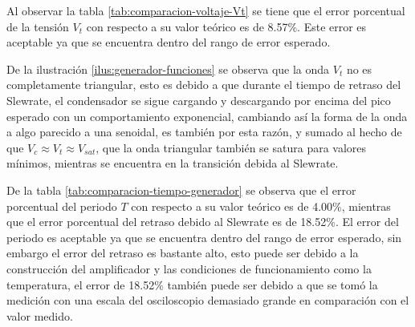 Al observar la tabla \ref{tab:comparacion-voltaje-Vt} se tiene que el error porcentual de la tensión $V_t$ con respecto a su valor teórico es de 8.57\%. Este error es aceptable ya que se encuentra dentro del rango de error esperado.

De la ilustración \ref{ilus:generador-funciones} se observa que la onda $V_t$ no es completamente triangular, esto es debido a que durante el tiempo de retraso del Slewrate, el condensador se sigue cargando y descargando por encima del pico esperado con un comportamiento exponencial, cambiando así la forma de la onda a algo parecido a una senoidal, es también por esta razón, y sumado al hecho de que $V_c \approx V_t \approx V_{sat}$, que la onda triangular también se satura para valores mínimos, mientras se encuentra en la transición debida al Slewrate.

De la tabla \ref{tab:comparacion-tiempo-generador} se observa que el error porcentual del periodo $T$ con respecto a su valor teórico es de 4.00\%, mientras que el error porcentual del retraso debido al Slewrate es de 18.52\%. El error del periodo es aceptable ya que se encuentra dentro del rango de error esperado, sin embargo el error del retraso es bastante alto, esto puede ser debido a la construcción del amplificador y las condiciones de funcionamiento como la temperatura, el error de 18.52\% también puede ser debido a que se tomó la medición con una escala del osciloscopio demasiado grande en comparación con el valor medido.